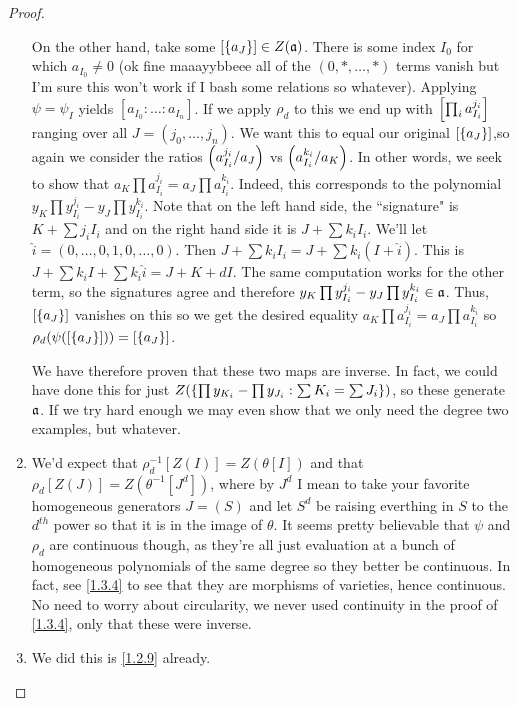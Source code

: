 \begin{proof}
\begin{enumerate}[label = (\alph*)]
        On the other hand, take some $[{\left\{a_J\right\}}] \in Z(\mathfrak a)$. There is some index $I_0$ for which $a_{I_0} \neq 0$ (ok fine maaayybbeee all of the $(0, *, \dots, *)$ terms vanish but I'm sure this won't work if I bash some relations so whatever). Applying $\psi = \psi_I$ yields $[a_{I_0} : \dots : a_{I_n}]$. If we apply $\rho_d$ to this we end up with ${\left[\prod_i a_{I_i}^{j_i}\right]}$ ranging over all $J = (j_0, \dots, j_n)$. We want this to equal our original $[{\left\{a_J\right\}}]$,so again we consider the ratios ${\left(a_{I_i}^{j_i} / a_J\right)}$ vs ${\left(a_{I_i}^{k_i} / a_K\right)}$. In other words, we seek to show that $a_K \prod a_{I_i}^{j_i} = a_J \prod a_{I_i}^{k_i}$. Indeed, this corresponds to the polynomial $y_K \prod y_{I_i}^{j_i} - y_J \prod y_{I_i}^{k_i}$. Note that on the left hand side, the ``signature" is $K + \sum j_i I_i$ and on the right hand side it is $J + \sum k_i I_i$. We'll let $\hat{i} = (0, \dots, 0, 1, 0, \dots, 0)$. Then $J + \sum k_i I_i = J + \sum k_i (I + \hat{i})$. This is $J + \sum k_i I + \sum k_i \hat{i} = J + K + dI$. The same computation works for the other term, so the signatures agree and therefore $y_K \prod y_{I_i}^{j_i} - y_J \prod y_{I_i}^{k_i} \in \mathfrak a$. Thus, $[{\left\{a_J\right\}}]$ vanishes on this so we get the desired equality $a_K \prod a_{I_i}^{j_i} = a_J \prod a_{I_i}^{k_i}$ so $\rho_d(\psi([{\left\{a_J\right\}}])) = [{\left\{a_J\right\}}]$.

        We have therefore proven that these two maps are inverse. In fact, we could have done this for just $Z({\left\{\prod y_{K_i} - \prod y_{J_i} : \sum K_i = \sum J_i\right\}})$, so these generate $\mathfrak a$. If we try hard enough we may even show that we only need the degree two examples, but whatever.

        \item We'd expect that $\rho_d^{-1}[Z(I)] = Z(\theta[I])$ and that $\rho_d[Z(J)] = Z(\theta^{-1}[J^d])$, where by $J^d$ I mean to take your favorite homogeneous generators $J = (S)$ and let $S^d$ be raising everthing in $S$ to the $d^{th}$ power so that it is in the image of $\theta$. It seems pretty believable that $\psi$ and $\rho_d$ are continuous though, as they're all just evaluation at a bunch of homogeneous polynomials of the same degree so they better be continuous. In fact, see \ref{1.3.4} to see that they are morphisms of varieties, hence continuous. No need to worry about circularity, we never used continuity in the proof of \ref{1.3.4}, only that these were inverse.

        \item We did this is \ref{1.2.9} already.
    \end{enumerate}
\end{proof}
